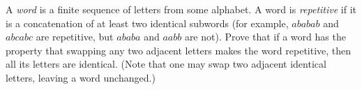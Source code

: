 A \emph{word} is a finite sequence of letters from some alphabet. A word is \emph{repetitive} if it is a concatenation of at least two identical subwords (for example, $ababab$ and $abcabc$ are repetitive, but $ababa$ and $aabb$ are not). Prove that if a word has the property that swapping any two adjacent letters makes the word repetitive, then all its letters are identical. (Note that one may swap two adjacent identical letters, leaving a word unchanged.)